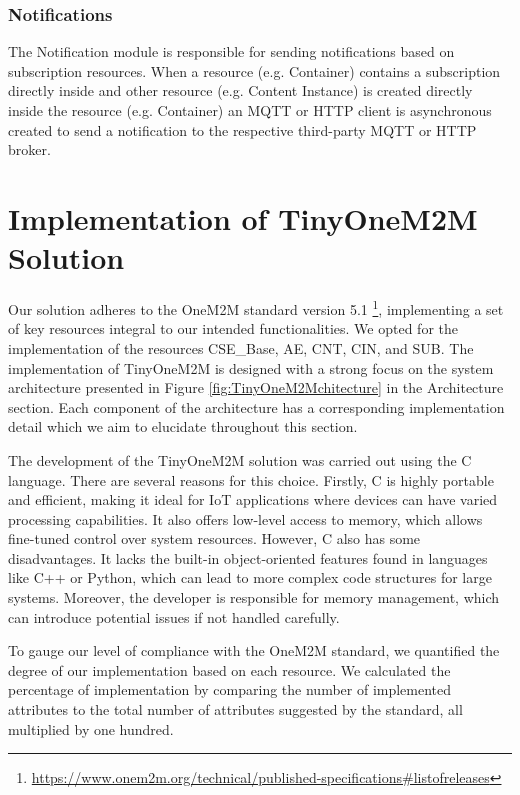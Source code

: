 \documentclass[a4paper,fleqn]{cas-dc}
\begin{document}
\subsubsection{Notifications}

The Notification module is responsible for sending notifications based on subscription resources. When a resource (e.g. Container) contains a subscription directly inside and other resource (e.g. Content Instance) is created directly inside the resource (e.g. Container) an MQTT or HTTP client is asynchronous created to send a notification to the respective third-party MQTT or HTTP broker.

\section{Implementation of TinyOneM2M Solution} \label{sec:tinyonem2msolution}

Our solution adheres to the OneM2M standard version 5.1 \footnote{\url{https://www.onem2m.org/technical/published-specifications\#listofreleases}}, implementing a set of key resources integral to our intended functionalities. We opted for the implementation of the resources CSE\_Base, AE, CNT, CIN, and SUB. The implementation of TinyOneM2M is designed with a strong focus on the system architecture presented in Figure \ref{fig:TinyOneM2Mchitecture} in the Architecture section. Each component of the architecture has a corresponding implementation detail which we aim to elucidate throughout this section.

The development of the TinyOneM2M solution was carried out using the C language. There are several reasons for this choice. Firstly, C is highly portable and efficient, making it ideal for IoT applications where devices can have varied processing capabilities. It also offers low-level access to memory, which allows fine-tuned control over system resources. However, C also has some disadvantages. It lacks the built-in object-oriented features found in languages like C++ or Python, which can lead to more complex code structures for large systems. Moreover, the developer is responsible for memory management, which can introduce potential issues if not handled carefully.

To gauge our level of compliance with the OneM2M standard, we quantified the degree of our implementation based on each resource. We calculated the percentage of implementation by comparing the number of implemented attributes to the total number of attributes suggested by the standard, all multiplied by one hundred.
\end{document}
